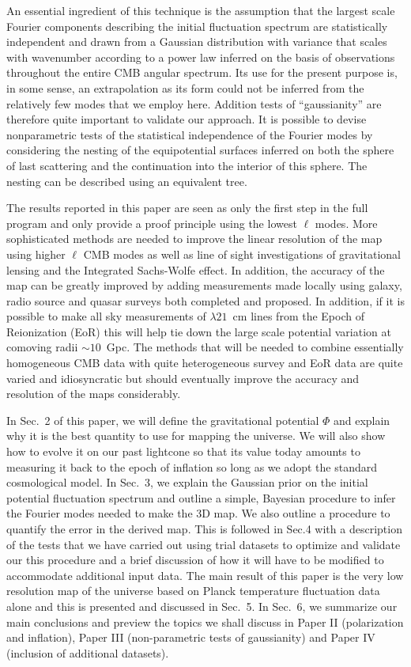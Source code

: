\documentclass[useAMS,usenatbib,a4paper]{mn2e}
\begin{document}
An essential ingredient of this technique is the assumption that the
largest scale Fourier components describing the initial fluctuation
spectrum are statistically independent and drawn from a Gaussian
distribution with variance that scales with wavenumber according to a
power law inferred on the basis of observations throughout the entire
CMB angular spectrum. Its use for the present purpose is, in some
sense, an extrapolation as its form could not be inferred from the
relatively few modes that we employ here. Addition tests of
``gaussianity'' are therefore quite important to validate our
approach. It is possible to devise nonparametric tests of the
statistical independence of the Fourier modes by considering the
nesting of the equipotential surfaces inferred on both the sphere of
last scattering and the continuation into the interior of this sphere.
The nesting can be described using an equivalent tree.

The results reported in this paper are seen as only the first step in
the full program and only provide a proof principle using the lowest
$\ell$ modes. More sophisticated methods are needed to improve the
linear resolution of the map using higher $\ell$ CMB modes as well as
line of sight investigations of gravitational lensing and the
Integrated Sachs-Wolfe effect. In addition, the accuracy of the map
can be greatly improved by adding measurements made locally using
galaxy, radio source and quasar surveys both completed and proposed.
In addition, if it is possible to make all sky measurements of
$\lambda21$~cm lines from the Epoch of Reionization (EoR) this will
help tie down the large scale potential variation at comoving radii
$\sim10$~Gpc. The methods that will be needed to combine essentially
homogeneous CMB data with quite heterogeneous survey and EoR data are
quite varied and idiosyncratic but should eventually improve the
accuracy and resolution of the maps considerably.

In Sec.~2 of this paper, we will define the gravitational potential
$\Phi$ and explain why it is the best quantity to use for mapping the
universe. We will also show how to evolve it on our past lightcone so
that its value today amounts to measuring it back to the epoch of
inflation so long as we adopt the standard cosmological model. In
Sec.~3, we explain the Gaussian prior on the initial potential
fluctuation spectrum and outline a simple, Bayesian procedure to infer
the Fourier modes needed to make the 3D map. We also outline a
procedure to quantify the error in the derived map. This is followed
in Sec.4 with a description of the tests that we have carried out
using trial datasets to optimize and validate our this procedure and a
brief discussion of how it will have to be modified to accommodate
additional input data. The main result of this paper is the very low
resolution map of the universe based on Planck temperature fluctuation
data alone and this is presented and discussed in Sec.~5. In Sec.~6,
we summarize our main conclusions and preview the topics we shall
discuss in Paper II (polarization and inflation), Paper III
(non-parametric tests of gaussianity) and Paper IV (inclusion of
additional datasets).
\end{document}

